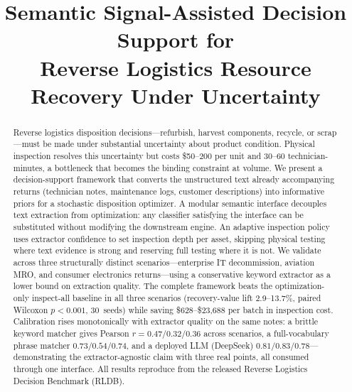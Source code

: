 \documentclass[conference]{IEEEtran}
\begin{document}
\title{Semantic Signal-Assisted Decision Support for\\
       Reverse Logistics Resource Recovery Under Uncertainty}

\author{%
\IEEEauthorblockN{[Author~1]}
\and
\IEEEauthorblockN{[Author~2]}
}

\maketitle

\begin{abstract}
Reverse logistics disposition decisions---refurbish, harvest components, recycle,
or scrap---must be made under substantial uncertainty about product condition.
Physical inspection resolves this uncertainty but costs \$50--200 per unit and
30--60 technician-minutes, a bottleneck that becomes the binding constraint at
volume. We present a decision-support framework that converts the unstructured
text already accompanying returns (technician notes, maintenance logs, customer
descriptions) into informative priors for a stochastic disposition optimizer.
A modular semantic interface decouples text extraction from optimization: any
classifier satisfying the interface can be substituted without modifying the
downstream engine. An adaptive inspection policy uses extractor confidence to set
inspection depth per asset, skipping physical testing where text evidence is
strong and reserving full testing where it is not. We validate across three
structurally distinct scenarios---enterprise IT decommission, aviation MRO, and
consumer electronics returns---using a conservative keyword extractor as a lower
bound on extraction quality. The complete framework beats the optimization-only
inspect-all baseline in all three scenarios (recovery-value lift 2.9--13.7\%,
paired Wilcoxon $p{<}0.001$, 30~seeds) while saving \$628--\$23,688 per batch in
inspection cost. Calibration rises monotonically with extractor quality on the
same notes: a brittle keyword matcher gives Pearson $r{=}0.47/0.32/0.36$ across
scenarios, a full-vocabulary phrase matcher $0.73/0.54/0.74$, and a deployed LLM
(DeepSeek) $0.81/0.83/0.78$---demonstrating the extractor-agnostic claim with
three real points, all consumed through one interface. All results reproduce from
the released Reverse Logistics Decision Benchmark (RLDB).
\end{abstract}
\end{document}
